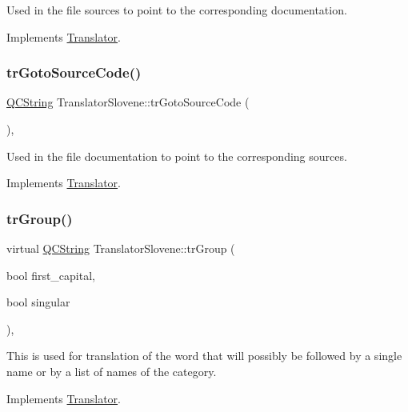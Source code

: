 Used in the file sources to point to the corresponding documentation. 

Implements \mbox{\hyperlink{class_translator}{Translator}}.

\mbox{\label{class_translator_slovene_aa2e818df94f36fcb503a542bf29986fe}} 
\subsubsection{\texorpdfstring{trGotoSourceCode()}{trGotoSourceCode()}}
{\footnotesize\ttfamily \mbox{\hyperlink{class_q_c_string}{Q\+C\+String}} Translator\+Slovene\+::tr\+Goto\+Source\+Code (\begin{DoxyParamCaption}{ }\end{DoxyParamCaption})\hspace{0.3cm}{\ttfamily [inline]}, {\ttfamily [virtual]}}

Used in the file documentation to point to the corresponding sources. 

Implements \mbox{\hyperlink{class_translator}{Translator}}.

\mbox{\label{class_translator_slovene_a18cdf07250591f1b7a1849201753b212}} 
\subsubsection{\texorpdfstring{trGroup()}{trGroup()}}
{\footnotesize\ttfamily virtual \mbox{\hyperlink{class_q_c_string}{Q\+C\+String}} Translator\+Slovene\+::tr\+Group (\begin{DoxyParamCaption}\item[{bool}]{first\+\_\+capital,  }\item[{bool}]{singular }\end{DoxyParamCaption})\hspace{0.3cm}{\ttfamily [inline]}, {\ttfamily [virtual]}}

This is used for translation of the word that will possibly be followed by a single name or by a list of names of the category. 

Implements \mbox{\hyperlink{class_translator}{Translator}}.

